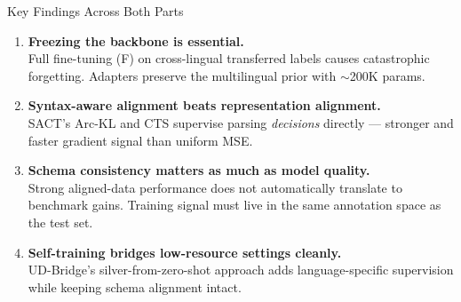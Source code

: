 \documentclass[aspectratio=169,10pt]{beamer}
\begin{document}
\begin{frame}{Key Findings Across Both Parts}
\begin{enumerate}
  \item \textbf{Freezing the backbone is essential.}\\
        Full fine-tuning (F) on cross-lingual transferred labels causes catastrophic forgetting.
        Adapters preserve the multilingual prior with $\sim$200K params.

  \vspace{0.25cm}
  \item \textbf{Syntax-aware alignment beats representation alignment.}\\
        SACT's Arc-KL and CTS supervise parsing \emph{decisions} directly ---
        stronger and faster gradient signal than uniform MSE.

  \vspace{0.25cm}
  \item \textbf{Schema consistency matters as much as model quality.}\\
        Strong aligned-data performance does not automatically translate to benchmark gains.
        Training signal must live in the same annotation space as the test set.

  \vspace{0.25cm}
  \item \textbf{Self-training bridges low-resource settings cleanly.}\\
        UD-Bridge's silver-from-zero-shot approach adds language-specific
        supervision while keeping schema alignment intact.
\end{enumerate}
\end{frame}
\end{document}
